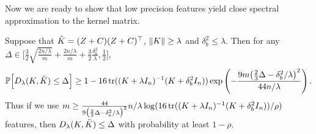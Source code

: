 Now we are ready to show that low precision features yield close spectral
approximation to the kernel matrix.

\begin{theorem}
  Suppose that $\tilde{K} = (Z+C)(Z+C)^\top$, $\|K\| \geq \lambda$ and $\delta^2_b \leq \lambda$.
  Then for any $\Delta \in \Big[\frac{3}{2}\sqrt{\frac{2n/\lambda}{m}} + \frac{2n/\lambda}{m} + \frac{3}{2}\frac{\delta^2_b}{\lambda}, \frac{1}{2} \Big]$,
  \begin{equation*}
    \mathbb{P}\Big[D_{\lambda}(K,\tilde{K}) \leq \Delta\Big] \geq 1 - 16 \mathop{\rm tr}((K +
    \lambda I_n)^{-1} (K + \delta^2_b I_n)) \exp \left( -\frac{9m \big(\frac{2}{3}\Delta - \delta^2_b / \lambda\big)^2}{44n/\lambda} \right).
  \end{equation*}
  Thus if we use $m \geq \frac{44}{9 \big(\frac{2}{3}\Delta - \delta^2_b / \lambda\big)^2} n/\lambda \log (16 \mathop{\rm tr}((K + \lambda I_n)^{-1} (K +
  \delta^2_b I_n)) / \rho)$
  features, then $D_\lambda(K,\tilde{K})\leq \Delta$  with probability at least $1 - \rho$.
\end{theorem}


